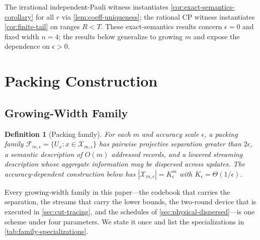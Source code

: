 \documentclass[aps,prx,reprint,floatfix,superscriptaddress]{revtex4-2}
\newtheorem{definition}{Definition}
\begin{document}
The irrational independent-Pauli witness instantiates
\cref{cor:exact-semantics-corollary} for all $r$ via
\cref{lem:coeff-uniqueness}; the rational CP witness instantiates
\cref{cor:finite-tail} on ranges $R < T$. These exact-semantics results
concern $\epsilon = 0$ and fixed width $n = 4$; the results below
generalize to growing $m$ and expose the dependence on $\epsilon>0$.


\section{Packing Construction}
\label{sec:packing}

\subsection{Growing-Width Family}

\begin{definition}[Packing family]
\label{def:packing-family}
For each $m$ and accuracy scale $\epsilon$, a packing family
$\mathcal F_{m,\epsilon}=\{U_x:x\in\mathcal X_{m,\epsilon}\}$ has
pairwise projective separation greater than $2\epsilon$, a semantic
description of $O(m)$ addressed records, and a lowered streaming
description whose aggregate information may be dispersed across updates.
The accuracy-dependent construction below has
$|\mathcal X_{m,\epsilon}|=K_\epsilon^m$ with
$K_\epsilon=\Theta(1/\epsilon)$.
\end{definition}

Every growing-width family in this paper---the codebook that carries the
separation, the streams that carry the lower bounds, the two-round
device that is executed in \cref{sec:cut-tracing}, and the schedules of
\cref{sec:physical-dispersed}---is one scheme under four parameters.  We
state it once and list the specializations in
\cref{tab:family-specializations}.
\end{document}
